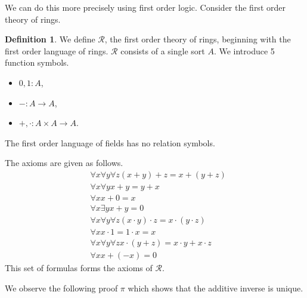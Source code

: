 \documentclass[12pt]{article}
\theoremstyle{plain}
\theoremstyle{definition}
\newtheorem{defn}[thm]{Definition} %
\newcommand{\call}[1]{\mathcal{#1}}
\newcommand{\lto}{\longrightarrow}
\newenvironment{scprooftree}[1]%
{\gdef\scalefactor{#1}\begin{center}\proofSkipAmount \leavevmode}%
	{\scalebox{\scalefactor}{\DisplayProof}\proofSkipAmount \end{center} }
\begin{document}
	We can do this more precisely using first order logic. Consider the first order theory of rings.
	\begin{defn}\label{def:FoT_rings}
		We define $\call{R}$, the first order theory of rings, beginning with the first order language of rings. $\call{R}$ consists of a single sort $A$. We introduce 5 function symbols.
		\begin{itemize}
			\item $0,1: A$,
			\item $-: A \lto A$,
			\item $+, \cdot: A \times A \lto A$.
		\end{itemize}
		The first order language of fields has no relation symbols.
		
		The axioms are given as follows.
		\begin{align}
			&\forall x \forall y \forall z(x + y) + z = x + (y + z)\\
			&\forall x \forall y x + y = y + x\\
			&\forall x x + 0 = x\\
			&\forall x \exists y x + y = 0\\
			&\forall x \forall y \forall z(x\cdot y)\cdot z = x \cdot (y \cdot z)\\
			&\forall x x \cdot 1 = 1 \cdot x = x\\
			&\forall x \forall y \forall z x\cdot (y + z) = x\cdot y + x \cdot z\\
			&\forall x x + (-x) = 0
		\end{align}
		This set of formulas forms the axioms of $\call{R}$.
		\end{defn}
	We observe the following proof $\pi$ which shows that the additive inverse is unique.
	\begin{center}
		\begin{scprooftree}{0.75}
		\doubleLine
		\end{scprooftree}
		\end{center}
\end{document}
